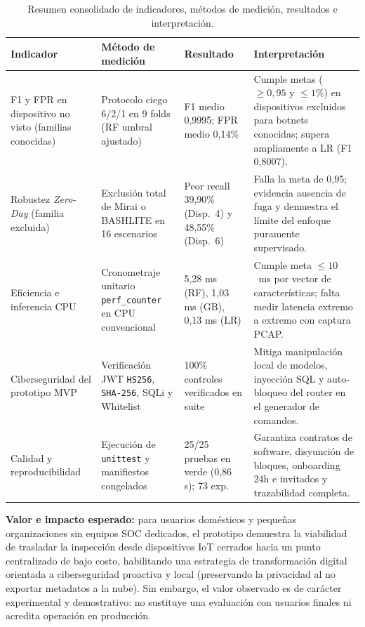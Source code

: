 \documentclass[11pt,a4paper]{article}
\begin{document}
\begin{table}[H]
\centering\footnotesize
\caption{Resumen consolidado de indicadores, métodos de medición, resultados e interpretación.}
\label{tab:resultados}
\begin{tabularx}{\textwidth}{p{2.7cm} p{3.1cm} p{2.7cm} X}
\toprule
\textbf{Indicador} & \textbf{Método de medición} & \textbf{Resultado} & \textbf{Interpretación} \\
\midrule
F1 y FPR en dispositivo no visto (familias conocidas) & Protocolo ciego 6/2/1 en 9 folds (RF umbral ajustado) & F1 medio 0,9995; FPR medio 0,14\% & Cumple metas ($\ge 0{,}95$ y $\le 1\%$) en dispositivos excluidos para botnets conocidas; supera ampliamente a LR (F1 0,8007). \\
Robustez \textit{Zero-Day} (familia excluida) & Exclusión total de Mirai o BASHLITE en 16 escenarios & Peor recall 39,90\% (Disp.~4) y 48,55\% (Disp.~6) & Falla la meta de 0,95; evidencia ausencia de fuga y demuestra el límite del enfoque puramente supervisado. \\
Eficiencia e inferencia CPU & Cronometraje unitario \texttt{perf\_counter} en CPU convencional & 5,28 ms (RF), 1,03 ms (GB), 0,13 ms (LR) & Cumple meta $\le 10$~ms por vector de características; falta medir latencia extremo a extremo con captura PCAP. \\
Ciberseguridad del prototipo MVP & Verificación JWT \texttt{HS256}, \texttt{SHA-256}, SQLi y Whitelist & 100\% controles verificados en suite & Mitiga manipulación local de modelos, inyección SQL y auto-bloqueo del router en el generador de comandos. \\
Calidad y reproducibilidad & Ejecución de \texttt{unittest} y manifiestos congelados & 25/25 pruebas en verde (0,86 s); 73 exp. & Garantiza contratos de software, disyunción de bloques, onboarding 24h e invitados y trazabilidad completa. \\
\bottomrule
\end{tabularx}
\end{table}

\textbf{Valor e impacto esperado:} para usuarios domésticos y pequeñas organizaciones sin equipos SOC dedicados, el prototipo demuestra la viabilidad de trasladar la inspección desde dispositivos IoT cerrados hacia un punto centralizado de bajo costo, habilitando una estrategia de transformación digital orientada a ciberseguridad proactiva y local (preservando la privacidad al no exportar metadatos a la nube). Sin embargo, el valor observado es de carácter experimental y demostrativo: no sustituye una evaluación con usuarios finales ni acredita operación en producción.
\end{document}
